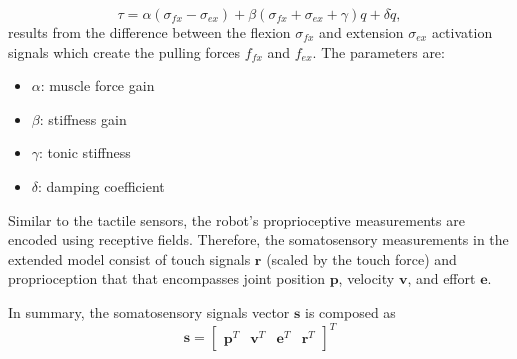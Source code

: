 \begin{equation}\label{eq:antagonistic_torque}
	\tau = \alpha \left(\sigma_{fx} - \sigma_{ex}\right)  + \beta \left(\sigma_{fx} + \sigma_{ex} + \gamma \right) q + \delta \dot{q},
\end{equation}
results from the difference between the flexion $ \sigma_{fx} $ and  extension $\sigma_{ex}$ activation signals which create the pulling forces $ f_{fx}$ and $f_{ex} $. The parameters are:
\begin{itemize}
	\item $\alpha$: muscle force gain
	\item $\beta$: stiffness gain
	\item $\gamma$: tonic stiffness	
	\item $\delta$: damping coefficient
\end{itemize}

Similar to the tactile sensors, the robot's proprioceptive measurements are encoded using receptive fields. Therefore, the somatosensory measurements in the extended model consist of touch signals $\bm{r}$ (scaled by the touch force) and proprioception that that encompasses joint position $\bm{p}$, velocity $\bm{v}$, and effort $\bm{e}$.

In summary, the somatosensory signals vector $\bm{s}$ is composed as 
\begin{equation}
	\bm{s} = \begin{bmatrix}
		\bm{p}^T & \bm{v}^T & \bm{e}^T & \bm{r}^T
	\end{bmatrix}^T
\end{equation}

